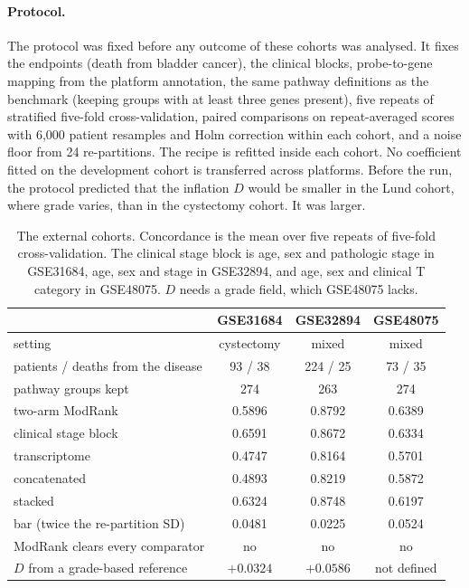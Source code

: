 \documentclass[11pt]{article}
\begin{document}
\paragraph{Protocol.} The protocol was fixed before any outcome of these cohorts was analysed. It
fixes the endpoints (death from bladder cancer), the clinical blocks, probe-to-gene mapping from the
platform annotation, the same pathway definitions as the benchmark (keeping groups with at least
three genes present), five repeats of stratified five-fold cross-validation, paired comparisons on
repeat-averaged scores with 6,000 patient resamples and Holm correction within each cohort, and a
noise floor from 24 re-partitions. The recipe is refitted inside each cohort. No coefficient fitted
on the development cohort is transferred across platforms. Before the run, the protocol predicted
that the inflation $D$ would be smaller in the Lund cohort, where grade varies, than in the
cystectomy cohort. It was larger.

\begin{table}[h]
\centering
{\small
\setlength{\tabcolsep}{4pt}
\begin{tabular}{lccc}
\toprule
 & GSE31684 & GSE32894 & GSE48075 \\
\midrule
setting & cystectomy & mixed & mixed \\
patients / deaths from the disease & 93 / 38 & 224 / 25 & 73 / 35 \\
pathway groups kept & 274 & 263 & 274 \\
two-arm ModRank & 0.5896 & 0.8792 & 0.6389 \\
clinical stage block & 0.6591 & 0.8672 & 0.6334 \\
transcriptome & 0.4747 & 0.8164 & 0.5701 \\
concatenated & 0.4893 & 0.8219 & 0.5872 \\
stacked & 0.6324 & 0.8748 & 0.6197 \\
bar (twice the re-partition SD) & 0.0481 & 0.0225 & 0.0524 \\
ModRank clears every comparator & no & no & no \\
$D$ from a grade-based reference & $+0.0324$ & $+0.0586$ & not defined \\
\bottomrule
\end{tabular}}
\caption{The external cohorts. Concordance is the mean over five repeats of five-fold
cross-validation. The clinical stage block is age, sex and pathologic stage in GSE31684, age, sex and
stage in GSE32894, and age, sex and clinical T category in GSE48075. $D$ needs a grade field, which
GSE48075 lacks.}
\label{tab:geo}
\end{table}
\end{document}
